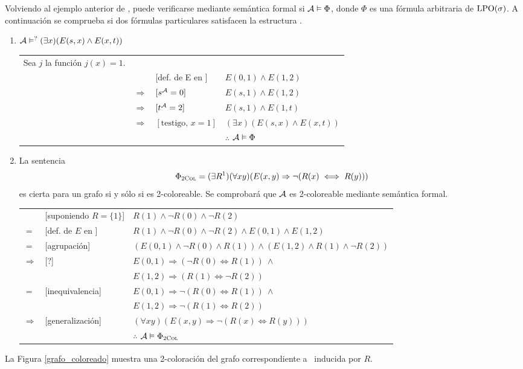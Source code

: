 Volviendo al ejemplo anterior de \A, puede verificarse mediante semántica 
formal si $\mathcal{A}\vDash\Phi$, donde $\Phi$
es una fórmula arbitraria de $\text{LPO}(\sigma)$. A continuación se comprueba si dos
fórmulas particulares satisfacen la estructura \A. 

\begin{enumerate}
\item $\mathcal{A}\vDash^?(\exists x)(E(s,x)\land E(x,t))$
\begin{center}
\begin{tabular}{llll}
Sea $j$ la función $j(x) = 1$.&&\\
&&[def. de E en \A] & $E(0, 1) \land E(1, 2)$\\
&$\Rightarrow$ & $[s^{\mathcal{A}} = 0]$ & $E(s, 1) \land E(1, 2)$\\
&$\Rightarrow$ & $[t^{\mathcal{A}} = 2]$ & $E(s, 1) \land E(1, t)$\\
&$\Rightarrow$ & $[\mbox{testigo, } x = 1]$ & $(\exists x)(E(s, x) \land E(x, t))$\\
&&&$\therefore$\hspace{5mm} $\mathcal{A} \vDash \Phi$
\end{tabular}
\end{center}

\item La sentencia
\[ \Phi_{\textsc{2Col}} = (\exists R^1)(\forall xy)(E(x,y)\Rightarrow \neg (R(x) \iff R(y))) \]
es cierta para un grafo si y sólo si es 2-coloreable.
Se comprobará que $\mathcal{A}$ es 2-coloreable mediante semántica formal.

\begin{center}
\begin{tabular}{lll}
&[suponiendo $R = \{1\}$] & $R(1) \land \neg R(0) \land \neg R(2)$\\
$=$ & [def. de $E$ en \A] & $R(1) \land \neg R(0) \land \neg R(2) \land 
E(0, 1) \land E(1, 2)$\\
$=$ & [agrupación] & $(E(0, 1) \land \neg R(0) \land R(1)) \land
(E(1, 2) \land R(1) \land \neg R(2))$\\
$\Rightarrow$ & [?] & $E(0, 1) \Rightarrow (\neg R(0) \iff R(1))\ \land$\\
&&$E(1, 2) \Rightarrow (R(1) \iff \neg R(2))$\\
$=$ & [inequivalencia] & $E(0, 1) \Rightarrow \neg(R(0) \iff R(1))\ \land$\\
&&$E(1, 2) \Rightarrow \neg(R(1) \iff R(2))$\\
$\Rightarrow$ & [generalización] & $(\forall xy)(E(x, y) \Rightarrow \neg(R(x) \iff R(y)))$\\
&&$\therefore$ \hspace{5mm} $\mathcal{A} \vDash \Phi_{\textsc{2Col}}$
\end{tabular}
\end{center}
\end{enumerate}
La Figura \ref{grafo_coloreado} muestra una 2-coloración del grafo correspondiente a \A
\ inducida por $R$.

